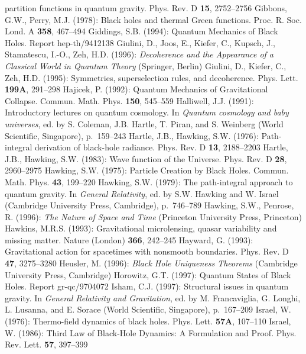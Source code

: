 \documentclass[12pt]{article}
\begin{document}
\begin{thebibliography}{999}
partition functions in quantum gravity. Phys. Rev. D {\bf 15},
2752--2756
%
\bibitem{}{}{}
Gibbons, G.W., Perry, M.J. (1978): Black holes and thermal
Green functions. Proc. R. Soc. Lond. A {\bf 358}, 467--494
%
\bibitem{}{}{}
Giddings, S.B. (1994): Quantum Mechanics of Black Holes.
Report hep-th/9412138
%
\bibitem{}{}{} Giulini, D., Joos, E., Kiefer, C., Kupsch, J.,
Stamatescu, I.-O., Zeh, H.D. (1996): {\it Decoherence and the
Appearance of a Classical World in Quantum Theory} (Springer, Berlin)
%
\bibitem{}{}{}
Giulini, D., Kiefer, C., Zeh, H.D. (1995): Symmetries, superselection
rules, and decoherence. Phys. Lett. {\bf 199A}, 291--298
%
\bibitem{}{}{}
Hajicek, P. (1992): Quantum Mechanics of Gravitational Collapse.
Commun. Math. Phys. {\bf 150}, 545--559
%
\bibitem{}{}{}
Halliwell, J.J. (1991): Introductory lectures on quantum cosmology.
In {\it Quantum cosmology and baby universes}, ed. by S. Coleman,
J.B. Hartle, T. Piran, and S. Weinberg (World Scientific, Singapore),
p.~159--243
%
\bibitem{}{}{}
Hartle, J.B., Hawking, S.W. (1976): Path-integral derivation of
black-hole radiance. Phys. Rev. D {\bf 13}, 2188--2203
%
\bibitem{}{}{}
Hartle, J.B., Hawking, S.W. (1983):
Wave function of the Universe. Phys. Rev. D {\bf 28}, 2960--2975
%
\bibitem{}{}{}
Hawking, S.W. (1975): Particle Creation by Black Holes.
Commun. Math. Phys. {\bf 43}, 199--220
%
\bibitem{}{}{}
Hawking, S.W. (1979): The path-integral approach to quantum gravity.
In {\it General Relativity}, ed. by S.W. Hawking and W. Israel
(Cambridge University Press, Cambridge), p.~746--789
%
\bibitem{}{}{}
Hawking, S.W., Penrose, R. (1996): {\it The Nature of Space and
Time} (Princeton University Press, Princeton)
%
\bibitem{}{}{}
Hawkins, M.R.S. (1993): Gravitational microlensing, quasar variability
and missing matter. Nature (London) {\bf 366}, 242--245
%
\bibitem{}{}{}
Hayward, G. (1993): Gravitational action for spacetimes with
nonsmooth boundaries. Phys. Rev. D {\bf 47}, 3275--3280
%
\bibitem{}{}{}
Heusler, M. (1996): {\it Black Hole Uniqueness Theorems}
(Cambridge University Press, Cambridge)
%
\bibitem{}{}{}
Horowitz, G.T. (1997): Quantum States of Black Holes.
Report gr-qc/9704072
%
\bibitem{}{}{}
Isham, C.J. (1997): Structural issues in quantum gravity.
In {\it General Relativity and Gravitation},
ed. by M. Francaviglia, G. Longhi, L. Lusanna, and E. Sorace
(World Scientific, Singapore), p.~167--209
%
\bibitem{}{}{}
Israel, W. (1976): Thermo-field dynamics of black holes.
Phys. Lett. {\bf 57A}, 107--110
%
\bibitem{}{}{}
Israel, W. (1986): Third Law of Black-Hole Dynamics: A Formulation
and Proof. Phys. Rev. Lett. {\bf 57}, 397--399

\end{thebibliography}
\end{document}
